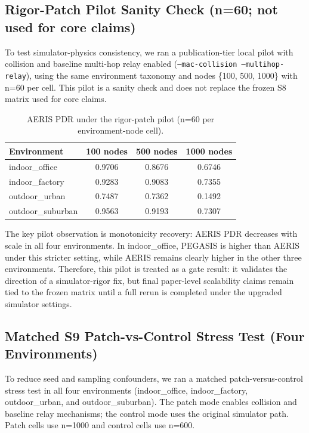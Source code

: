 \documentclass[sensors,article,submit,moreauthors,pdftex]{Definitions/mdpi}
\begin{document}
\subsection{Rigor-Patch Pilot Sanity Check (n=60; not used for core claims)}
To test simulator-physics consistency, we ran a publication-tier local pilot with collision and baseline multi-hop relay enabled (\texttt{--mac-collision --multihop-relay}), using the same environment taxonomy and nodes \{100, 500, 1000\} with n=60 per cell. This pilot is a sanity check and does not replace the frozen S8 matrix used for core claims.

\begin{table}[H]
\caption{AERIS PDR under the rigor-patch pilot (n=60 per environment-node cell).}
\label{tab:rigor_patch}
\centering
\begin{tabular}{lccc}
\toprule
Environment & 100 nodes & 500 nodes & 1000 nodes \\
\midrule
indoor\_office    & 0.9706 & 0.8676 & 0.6746 \\
indoor\_factory   & 0.9283 & 0.9083 & 0.7355 \\
outdoor\_urban    & 0.7487 & 0.7362 & 0.1492 \\
outdoor\_suburban & 0.9563 & 0.9193 & 0.7307 \\
\bottomrule
\end{tabular}
\end{table}

The key pilot observation is monotonicity recovery: AERIS PDR decreases with scale in all four environments. In indoor\_office, PEGASIS is higher than AERIS under this stricter setting, while AERIS remains clearly higher in the other three environments. Therefore, this pilot is treated as a gate result: it validates the direction of a simulator-rigor fix, but final paper-level scalability claims remain tied to the frozen matrix until a full rerun is completed under the upgraded simulator settings.

\subsection{Matched S9 Patch-vs-Control Stress Test (Four Environments)}
To reduce seed and sampling confounders, we ran a matched patch-versus-control stress test in all four environments (indoor\_office, indoor\_factory, outdoor\_urban, and outdoor\_suburban). The patch mode enables collision and baseline relay mechanisms; the control mode uses the original simulator path. Patch cells use n=1000 and control cells use n=600.
\end{document}
